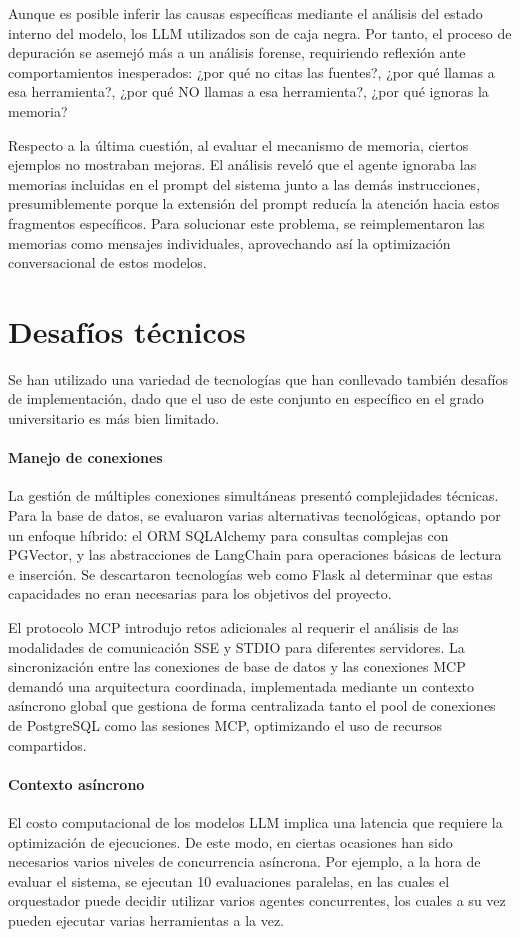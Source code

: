 Aunque es posible inferir las causas específicas mediante el análisis del estado interno del modelo, los LLM utilizados son de caja negra. Por tanto, el proceso de depuración se asemejó más a un análisis forense, requiriendo reflexión ante comportamientos inesperados: ¿por qué no citas las fuentes?, ¿por qué llamas a esa herramienta?, ¿por qué NO llamas a esa herramienta?, ¿por qué ignoras la memoria?

Respecto a la última cuestión, al evaluar el mecanismo de memoria, ciertos ejemplos no mostraban mejoras. El análisis reveló que el agente ignoraba las memorias incluidas en el prompt del sistema junto a las demás instrucciones, presumiblemente porque la extensión del prompt reducía la atención hacia estos fragmentos específicos. Para solucionar este problema, se reimplementaron las memorias como mensajes individuales, aprovechando así la optimización conversacional de estos modelos.

\section{Desafíos técnicos}
Se han utilizado una variedad de tecnologías que han conllevado también desafíos de implementación, dado que el uso de este conjunto en específico en el grado universitario es más bien limitado.

\paragraph{Manejo de conexiones}
La gestión de múltiples conexiones simultáneas presentó complejidades técnicas. Para la base de datos, se evaluaron varias alternativas tecnológicas, optando por un enfoque híbrido: el ORM SQLAlchemy para consultas complejas con PGVector, y las abstracciones de LangChain para operaciones básicas de lectura e inserción. Se descartaron tecnologías web como Flask al determinar que estas capacidades no eran necesarias para los objetivos del proyecto.

El protocolo MCP introdujo retos adicionales al requerir el análisis de las modalidades de comunicación SSE y STDIO para diferentes servidores. La sincronización entre las conexiones de base de datos y las conexiones MCP demandó una arquitectura coordinada, implementada mediante un contexto asíncrono global que gestiona de forma centralizada tanto el pool de conexiones de PostgreSQL como las sesiones MCP, optimizando el uso de recursos compartidos.

\paragraph{Contexto asíncrono}
El costo computacional de los modelos LLM implica una latencia que requiere la optimización de ejecuciones. De este modo, en ciertas ocasiones han sido necesarios varios niveles de concurrencia asíncrona. Por ejemplo, a la hora de evaluar el sistema, se ejecutan 10 evaluaciones paralelas, en las cuales el orquestador puede decidir utilizar varios agentes concurrentes, los cuales a su vez pueden ejecutar varias herramientas a la vez. 


